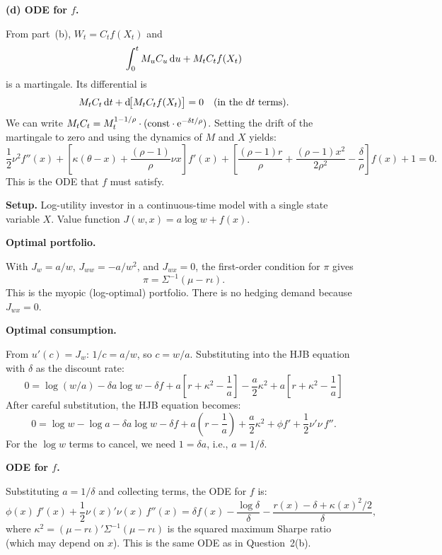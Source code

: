\baselineskip
\textbf{(d) ODE for $f$.}

From part~(b), $W_t = C_t f(X_t)$ and
$$\int_0^t M_u C_u\,\mathrm{d} u + M_t C_t f(X_t)$$
is a martingale.  Its differential is
$$M_t C_t\,\mathrm{d} t + \mathrm{d}\!\big[M_t C_t f(X_t)\big] = 0 \quad \text{(in the } \mathrm{d} t \text{ terms)}.$$
We can write $M_t C_t = M_t^{1-1/\rho}\cdot(\text{const}\cdot\mathrm{e}^{-\delta t/\rho})$.  Setting the drift of the martingale to zero and using the dynamics of $M$ and $X$ yields:
$$\frac{1}{2}\nu^2 f''(x) + \left[\kappa(\theta - x) + \frac{(\rho-1)}{\rho}\nu x\right]f'(x) + \left[\frac{(\rho-1)r}{\rho} + \frac{(\rho-1)x^2}{2\rho^2} - \frac{\delta}{\rho}\right]f(x) + 1 = 0.$$
This is the ODE that $f$ must satisfy.


\textbf{Setup.}  Log-utility investor in a continuous-time model with a single state variable $X$.  Value function $J(w,x) = a\log w + f(x)$.

\baselineskip
\textbf{Optimal portfolio.}

With $J_w = a/w$, $J_{ww} = -a/w^2$, and $J_{wx} = 0$, the first-order condition for $\pi$ gives
$$\pi = \Sigma^{-1}(\mu - r\iota).$$
This is the myopic (log-optimal) portfolio.  There is no hedging demand because $J_{wx} = 0$.

\baselineskip
\textbf{Optimal consumption.}

From $u'(c) = J_w$: $1/c = a/w$, so $c = w/a$.  Substituting into the HJB equation with $\delta$ as the discount rate:
$$0 = \log(w/a) - \delta a\log w - \delta f + a\left[r + \kappa^2 - \frac{1}{a}\right] - \frac{a}{2}\kappa^2 + a\left[r + \kappa^2 - \frac{1}{a}\right]$$
After careful substitution, the HJB equation becomes:
$$0 = \log w - \log a - \delta a\log w - \delta f + a\!\left(r - \frac{1}{a}\right) + \frac{a}{2}\kappa^2 + \phi f' + \frac{1}{2}\nu'\nu\,f''.$$
For the $\log w$ terms to cancel, we need $1 = \delta a$, i.e., $a = 1/\delta$.

\baselineskip
\textbf{ODE for $f$.}

Substituting $a = 1/\delta$ and collecting terms, the ODE for $f$ is:
$$\phi(x)\,f'(x) + \frac{1}{2}\nu(x)'\nu(x)\,f''(x) = \delta f(x) - \frac{\log\delta}{\delta} - \frac{r(x) - \delta + \kappa(x)^2/2}{\delta},$$
where $\kappa^2 = (\mu - r\iota)'\Sigma^{-1}(\mu - r\iota)$ is the squared maximum Sharpe ratio (which may depend on $x$).  This is the same ODE as in Question~2(b).

